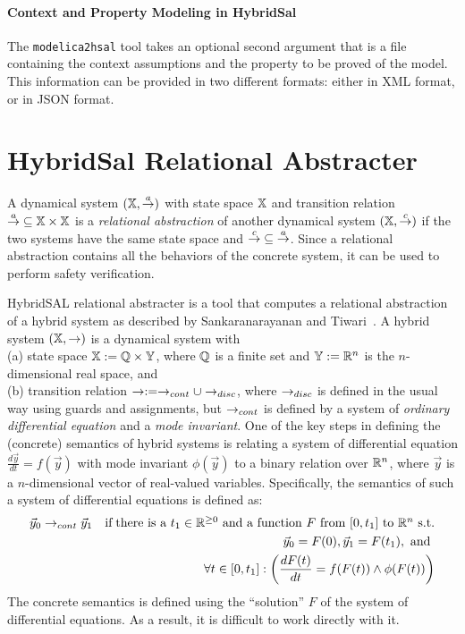 \documentclass{llncs}
\begin{document}
\paragraph{Context and Property Modeling in HybridSal}

The {\tt{modelica2hsal}} tool takes an optional second argument that
is a file containing the context assumptions and the property to be proved
of the model.
This information can be provided in two different formats: either in 
XML format, or in JSON format.

\section{HybridSal Relational Abstracter}\label{sec-ra}

A dynamical system $(\mathbb{X}, {\stackrel{a}{\rightarrow}})$  with state space $\mathbb{X}$ and
transition relation ${\stackrel{a}{\rightarrow}}\subseteq \mathbb{X}\times \mathbb{X}$ 
is a {\em{relational abstraction}} of another 
dynamical system $(\mathbb{X}, {\stackrel{c}{\rightarrow}})$ if
the two systems have the same state space and
${\stackrel{c}{\rightarrow}} \subseteq {\stackrel{a}{\rightarrow}}$.
Since a relational abstraction contains all the behaviors of the
concrete system, it can be used to perform safety verification.

HybridSAL relational abstracter is a tool that computes a relational
abstraction of a hybrid system as described by
Sankaranarayanan and Tiwari~\cite{ST11:CAVsmall}.
A hybrid system $(\mathbb{X}, \rightarrow)$ is a dynamical system with 
\\
(a) state space $\mathbb{X} := \mathbb{Q}\times\mathbb{Y}$, where $\mathbb{Q}$ is a finite set and
$\mathbb{Y} := \mathbb{R}^n$ is the $n$-dimensional real space,
and 
\\
(b)
transition relation $\rightarrow := \rightarrow_{cont}\cup\rightarrow_{disc}$, where
$\rightarrow_{disc}$ is defined in the usual way using guards and
assignments, but $\rightarrow_{cont}$ is defined by a system of
{\em{ordinary differential equation}} and a {\em{mode invariant}}.
One of the key steps in defining the (concrete)
semantics of hybrid systems
is relating a system of differential equation
$\frac{d\vec{y}}{dt} = f(\vec{y})$ with mode invariant
$\phi(\vec{y})$ to a binary relation 
over $\mathbb{R}^n$, where $\vec{y}$ is a $n$-dimensional vector of
real-valued variables.  Specifically, the semantics of
such a system of differential equations is defined as:
\begin{eqnarray}
\vec{y}_0 \ra_{cont} \vec{y}_1 & &
\mbox{if}\;
\mbox{there is a $t_1\in\RR^{\geq 0}$ and 
a function $F$ from $[0,t_1]$ to $\RR^n$ s.t.} \nonumber %
\\ & &
\vec{y}_0 = F(0),
\vec{y}_1 = F(t_1), \mbox{ and } \nonumber
\\ & &
\forall{t\in [0,t_1]}:
\left(\frac{dF(t)}{dt} = f(F(t)) \wedge \phi(F(t))\right)\label{eqn:sem}
%
\end{eqnarray}
The concrete semantics is defined using the ``solution''
$F$ of the system of differential equations.  As a result,
it is difficult to work directly with it.
\end{document}
